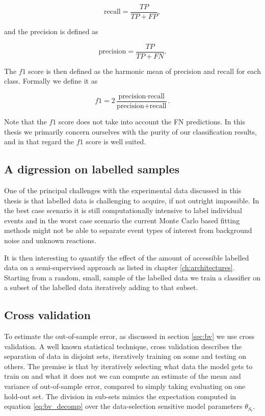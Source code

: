 \begin{equation}\label{eq:recall}
\text{recall}= \frac{TP}{TP + FP},
\end{equation}

\noindent and the precision is defined as

\begin{equation}\label{eq:precision}
\text{precision} = \frac{TP}{TP + FN}.
\end{equation}

\noindent The $f1$ score is then defined as the harmonic mean of precision and recall for each class. Formally we define it as

\begin{equation}\label{eq:f1}
f1 = 2 \frac{\text{precision} \cdot \text{recall}}{\text{precision} + \text{recall}}.
\end{equation}

\noindent Note that the $f1$ score does not take into account the FN predictions. In this thesis we primarily concern ourselves with the purity of our classification results, and in that regard the $f1$ score is well suited. 

\subsection{A digression on labelled samples}

One of the principal challenges with the experimental data discussed in this thesis is that labelled data is challenging to acquire, if not outright impossible. In the best case scenario it is still computationally intensive to label individual events and in the worst case scenario the current Monte Carlo based fitting methods might not be able to separate event types of interest from background noise and unknown reactions.

It is then interesting to quantify the effect of the amount of accessible labelled data on a semi-supervised approach as listed in chapter \ref{ch:architectures}. Starting from a random, small, sample of the labelled data we train a classifier on a subset of the labelled data iteratively adding to that subset. 


\subsection{Cross validation}\label{sec:cv}

To estimate the out-of-sample error, as discussed in section \ref{sec:bv} we use cross validation. A well known statistical technique, cross validation describes the separation of data in disjoint sets, iteratively training on some and testing on others. The premise is that by iteratively selecting what data the model gets to train on and what it does not we can compute an estimate of the mean and variance of out-of-sample error, compared to simply taking evaluating on one hold-out set. The division in sub-sets mimics the expectation computed in equation \ref{eq:bv_decomp} over the data-selection sensitive model parameters $\theta_{S_t}$. 

